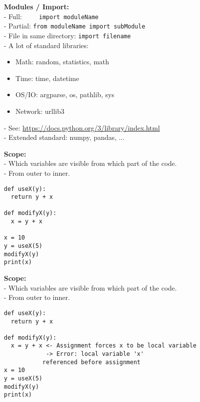 \documentclass{beamer}
\begin{document}
\begin{frame}[fragile]
    \textbf{Modules / Import:}\\
    - Full:~~~~~\texttt{import moduleName}\\
    - Partial: \texttt{from moduleName import subModule} \\
    - File in same directory: \texttt{import filename}\\
    - A lot of standard libraries:
    \begin{itemize}
        \item Math: random, statistics, math
        \item Time: time, datetime
        \item OS/IO: argparse, os, pathlib, sys
        \item Network: urllib3
    \end{itemize}
    - See: \url{https://docs.python.org/3/library/index.html}\\
    - Extended standard: numpy, pandas, ...


\end{frame}

\begin{frame}[fragile]
    \textbf{Scope:}\\
    - Which variables are visible from which part of the code.\\
    - From outer to inner.\\
    \begin{example}
        \begin{verbatim}
def useX(y):
  return y + x

def modifyX(y):
  x = y + x

x = 10
y = useX(5)
modifyX(y)
print(x)
        \end{verbatim}
    \end{example}
\end{frame}

\begin{frame}[fragile]
    \textbf{Scope:}\\
    - Which variables are visible from which part of the code.\\
    - From outer to inner.\\
    \begin{example}
        \begin{verbatim}
def useX(y):
  return y + x

def modifyX(y):
  x = y + x <- Assignment forces x to be local variable
            -> Error: local variable 'x'
           referenced before assignment
x = 10
y = useX(5)
modifyX(y)
print(x)
        \end{verbatim}
    \end{example}
\end{frame}
\end{document}
